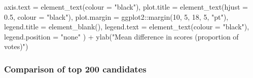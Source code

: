 \documentclass[
  11pt,
  oneside]{book}
\newenvironment{Shaded}{\begin{snugshade}}{\end{snugshade}}
\newcommand{\AttributeTok}[1]{\textcolor[rgb]{0.77,0.63,0.00}{#1}}
\newcommand{\DecValTok}[1]{\textcolor[rgb]{0.00,0.00,0.81}{#1}}
\newcommand{\FloatTok}[1]{\textcolor[rgb]{0.00,0.00,0.81}{#1}}
\newcommand{\FunctionTok}[1]{\textcolor[rgb]{0.00,0.00,0.00}{#1}}
\newcommand{\NormalTok}[1]{#1}
\newcommand{\SpecialCharTok}[1]{\textcolor[rgb]{0.00,0.00,0.00}{#1}}
\newcommand{\StringTok}[1]{\textcolor[rgb]{0.31,0.60,0.02}{#1}}
\begin{document}
\begin{Shaded}
\begin{Highlighting}[]
    \AttributeTok{axis.text =} \FunctionTok{element\_text}\NormalTok{(}\AttributeTok{colour =} \StringTok{"black"}\NormalTok{),}
    \AttributeTok{plot.title =} \FunctionTok{element\_text}\NormalTok{(}\AttributeTok{hjust =} \FloatTok{0.5}\NormalTok{, }\AttributeTok{colour =} \StringTok{"black"}\NormalTok{),}
    \AttributeTok{plot.margin =}\NormalTok{ ggplot2}\SpecialCharTok{::}\FunctionTok{margin}\NormalTok{(}\DecValTok{10}\NormalTok{, }\DecValTok{5}\NormalTok{, }\DecValTok{18}\NormalTok{, }\DecValTok{5}\NormalTok{, }\StringTok{"pt"}\NormalTok{),}
    \AttributeTok{legend.title =} \FunctionTok{element\_blank}\NormalTok{(),}
    \AttributeTok{legend.text =} \FunctionTok{element\_text}\NormalTok{(}\AttributeTok{colour =} \StringTok{"black"}\NormalTok{),}
    \AttributeTok{legend.position =} \StringTok{"none"}
\NormalTok{  ) }\SpecialCharTok{+}
  \FunctionTok{ylab}\NormalTok{(}\StringTok{"Mean difference in scores (proportion of votes)"}\NormalTok{)}
\end{Highlighting}
\end{Shaded}

\hypertarget{comparison-of-top-200-candidates}{%
\subsubsection{Comparison of top 200 candidates}\label{comparison-of-top-200-candidates}}
\end{document}
